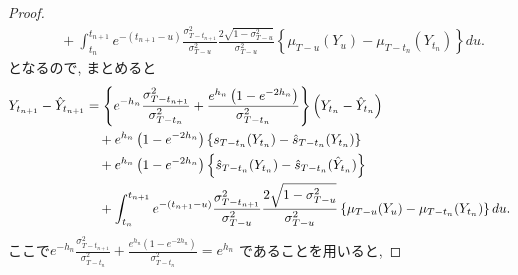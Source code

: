 \documentclass[11pt,a4paper]{ltjsarticle}
\theoremstyle{remark}
\begin{document}
\begin{proof}
\begin{align}
        &\quad
        +
        \int_{t_n}^{t_{n+1}}
        e^{-(t_{n+1}-u)}
        \frac{\sigma^2_{T-t_{n+1}}}{\sigma^2_{T-u}}
        \frac{2\sqrt{1-\sigma^2_{T-u}}}{\sigma^2_{T-u}}
        \left\{
            \mu_{T-u}(Y_u)
            -
            \mu_{T-t_n}(Y_{t_n})
        \right\}
        du .
    \end{align}
    となるので, まとめると
    \begin{align}
        Y_{t_{n+1}}-\hat{Y}_{t_{n+1}}
        &=
        \left\{
            e^{-h_n}
            \frac{\sigma^2_{T-t_{n+1}}}{\sigma^2_{T-t_n}}
            +
            \frac{
                e^{h_n}
                \left(
                    1-e^{-2h_n}
                \right)
            }{
                \sigma^2_{T-t_n}
            }
        \right\}
        \left(
            Y_{t_n}-\hat{Y}_{t_n}
        \right)
        \notag\\
        &\quad
        +
        e^{h_n}
        \left(
            1-e^{-2h_n}
        \right)
        \left\{
            s_{T-t_n}(Y_{t_n})
            -
            \hat{s}_{T-t_n}(Y_{t_n})
        \right\}
        \notag\\
        &\quad
        +
        e^{h_n}
        \left(
            1-e^{-2h_n}
        \right)
        \left\{
            \hat{s}_{T-t_n}(Y_{t_n})
            -
            \hat{s}_{T-t_n}(\hat{Y}_{t_n})
        \right\}
        \notag\\
        &\quad
        +
        \int_{t_n}^{t_{n+1}}
        e^{-(t_{n+1}-u)}
        \frac{\sigma^2_{T-t_{n+1}}}{\sigma^2_{T-u}}
        \frac{2\sqrt{1-\sigma^2_{T-u}}}{\sigma^2_{T-u}}
        \left\{
            \mu_{T-u}(Y_u)
            -
            \mu_{T-t_n}(Y_{t_n})
        \right\}
        du .
    \end{align}
    ここで$
        e^{-h_n}
        \frac{\sigma^2_{T-t_{n+1}}}{\sigma^2_{T-t_n}}
        +
        \frac{
            e^{h_n}
            \left(
                1-e^{-2h_n}
            \right)
        }{
            \sigma^2_{T-t_n}
        }
    =e^{h_n}$
    であることを用いると, 


\end{proof}
\end{document}

